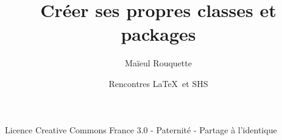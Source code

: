 \documentclass{beamer}
\author{Maïeul Rouquette}
\date{Rencontres \LaTeX\ et SHS}
\title{Créer ses propres classes et packages}
\institute{Université de Lausanne --- IRSB}
\begin{document}
\begin{frame}
\titlepage
\vfill
{\tiny Licence Creative Commons France 3.0 - Paternité - Partage à l'identique}
\end{frame}
\end{document}
